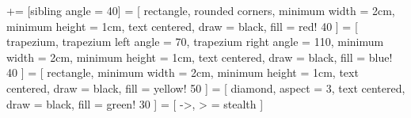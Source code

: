 \usepackage{microtype}
 += [sibling angle = 40]
 =
[	rectangle, rounded corners,
minimum width = 2cm,
minimum height = 1cm,
text centered,
draw = black,
fill = red! 40
]
 =
[	trapezium,
trapezium left angle = 70,
trapezium right angle = 110,
minimum width = 2cm,
minimum height = 1cm,
text centered,
draw = black,
fill = blue! 40
]
 =
[	rectangle,
minimum width = 2cm,
minimum height = 1cm,
text centered,
draw = black,
fill = yellow! 50
]
 =
[	diamond,
aspect = 3,
text centered,
draw = black,
fill = green! 30
]
 =
[	->,
> = stealth
]
\newcommand{\progressbar}[2][2cm]{%
	\textcolor{lightBlue}{\rule{#1 * \real{#2} / 100}{1.5ex}}%
	\textcolor{darkGrey!15}{\rule{#1 - #1 * \real{#2} / 100}{1.5ex}}
}
\usepackage
[	colorlinks = true,
	linkcolor = gray,
	citecolor = gray,
	backref=page
]{hyperref}
\renewcommand*\lstlistingname{代码}
\usepackage[framed,numbered,autolinebreaks,useliterate]{mcode}
\usepackage{boxie}
\newcommand{\MatlabLogo}{%
	\begin{tikzpicture}[x=2.4ex,y=2.4ex,line width=0ex,scale=1]
		\node[draw,fill=white,text=white] at (0, 0) (a) {
			\texttt{[image: matlabLogo/matlabLogo.ai]}
		};
	\end{tikzpicture}
}
